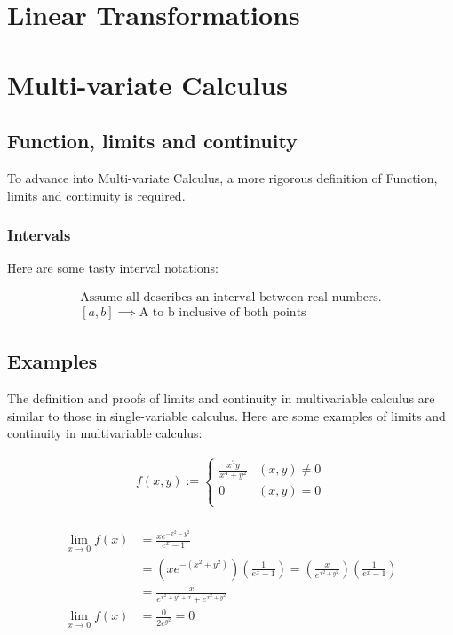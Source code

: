 \documentclass{article}
\begin{document}
\section{Linear Transformations}

\pagebreak

\section{Multi-variate Calculus}

\subsection{Function, limits and continuity}

To advance into Multi-variate Calculus, a more rigorous definition of Function, limits and continuity is required.

\subsubsection{Intervals}

Here are some tasty interval notations:

\begin{align}
    \textrm{Assume all describes an interval between real numbers.} \\
    [a,b] \implies \textrm{A to b inclusive of both points}
\end{align}

\subsection{Examples}

The definition and proofs of limits and continuity in multivariable calculus are similar to those in single-variable calculus. Here are some examples of limits and continuity in multivariable calculus:

\begin{align}
    f(x,y) := 
    \begin{cases}
    \frac{x^2 y}{x^4 + y^2} & (x,y) \neq 0 \\
    0 & (x,y) = 0 \\
    \end{cases} \\
\end{align}

\begin{align}
    \lim_{x\to0} f(x) &= \frac{xe^{-x^{2}-y^{2}}}{e^x - 1} \\
    &= (xe^{-(x^2+y^2)})(\frac{1}{e^x - 1}) = (\frac{x}{e^{x^2+y^2}})(\frac{1}{e^x - 1}) \\
    &= \frac{x}{e^{x^2+y^2+x} + e^{x^2+y^2}} \\
    \lim_{x\to0} f(x) &=\frac{0}{2e^{y^2}} = 0\\ 
\end{align}
\end{document}
